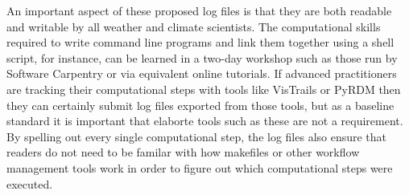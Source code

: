 An important aspect of these proposed log files is that they are both readable and writable by all weather and climate scientists. The computational skills required to write command line programs and link them together using a shell script, for instance, can be learned in a two-day workshop such as those run by Software Carpentry \citet{Wilson2014} or via equivalent online tutorials. If advanced practitioners are tracking their computational steps with tools like VisTrails or PyRDM then they can certainly submit log files exported from those tools, but as a baseline standard it is important that elaborte tools such as these are not a requirement. By spelling out every single computational step, the log files also ensure that readers do not need to be familar with how makefiles or other workflow management tools work in order to figure out which computational steps were executed.  

